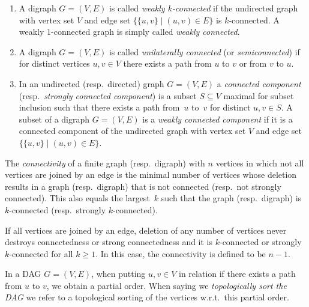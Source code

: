 \begin{enumerate}
	\item A digraph $G = (V, E)$ is called \emph{weakly $k$-connected}
	if the undirected graph with vertex set $V$ and edge set $\{ \{u,v \} \mid (u,v) \in E \}$
	is $k$-connected. A weakly $1$-connected graph is simply called \emph{weakly connected}.
	
	 
	\item A digraph $G = (V, E)$ is called \emph{unilaterally connected} (or \emph{semiconnected})
	if for distinct vertices $u, v \in V$ there exists a path from $u$ to $v$ or from $v$ to $u$.
		
	\item In an undirected (resp.~directed) graph $G = (V, E)$
    a \emph{connected component} (resp.~\emph{strongly connected component}) 
    is a subset $S \subseteq V$ maximal for subset inclusion
    such that there exists a path from~$u$ to~$v$
    for distinct $u,v \in S$.
	A subset of a digraph $G = (V,E)$ 
	is a \emph{weakly connected component} if 
	it is a connected component of the undirected graph with vertex set $V$
	and edge set $\{ \{u,v\} \mid (u,v) \in E \}$.
\end{enumerate} 

\begin{remark} \label{prelim:rem:connectedconnectivity}
	The \emph{connectivity}
	of a finite graph (resp.~digraph) with $n$ vertices
	in which not all vertices are joined by an edge
	is the minimal number of vertices whose
	deletion results in a
	graph (resp.~digraph)
	that is not connected (resp.~not strongly connected).
    This also equals the largest~$k$
    such that the graph (resp.~digraph)
    is $k$-connected (resp.~strongly $k$-connected).
        
    If all vertices are joined by an edge,
    deletion of any number of vertices never
    destroys connectedness or strong connectedness
    and it is $k$-connected or strongly $k$-connected
    for all $k \ge 1$.
    In this case, the connectivity is defined to be $n - 1$.
\end{remark}

In a DAG $G = (V, E)$,
when putting $u,v \in V$
in relation if there exists a path from $u$ to $v$, we obtain 
a partial order. 
When saying we \emph{topologically sort the DAG}
we refer to a topological sorting of the vertices
w.r.t.~this partial order.


